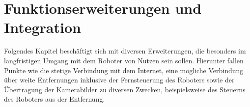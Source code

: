 \section{Funktionserweiterungen und Integration}
\label{sec:funktionserweiterungen-und-integration}

Folgendes Kapitel beschäftigt sich mit diversen Erweiterungen, die besonders im langfristigen Umgang mit dem Roboter
von Nutzen sein sollen.
Hierunter fallen Punkte wie die stetige Verbindung mit dem Internet, eine mögliche Verbindung über weite Entfernungen
inklusive der Fernsteuerung des Roboters sowie der Übertragung der Kamerabilder zu diversen Zwecken, beispielsweise
des Steuerns des Roboters aus der Entfernung.





